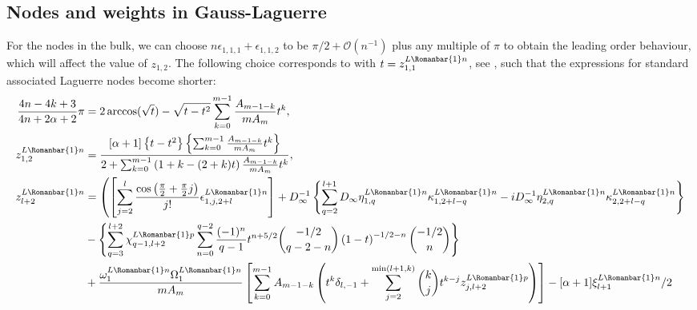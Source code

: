 \documentclass[11pt]{article}
\newcommand*{\Pc}[1]{{\color{blue}#1}}
\newcommand{\ql}{L}
\newcommand{\rb}{{\scriptsize \Romanbar{1}} }
\newcommand{\pg}{p}
\newcommand{\pn}{n}
\numberwithin{equation}{section}
\begin{document}
\subsection{Nodes and weights in Gauss-Laguerre} \label{SderxkwkGL}



For the nodes in the bulk, we %
can choose $n\epsilon_{1,1,1} +\epsilon_{1,1,2}$ to be $\pi/2 + \mathcal{O}(n^{-1})$ plus any multiple of $\pi$ to obtain the leading order behaviour, which will affect the value of $z_{1,2}$. The following choice corresponds to \cite[(57)]{tricBulk} with $t = z_{1,1}^{\ql\rb\pn}$, see \cite[\S 3.2 \& 4.3]{quadr}, such that the expressions for standard associated Laguerre nodes become shorter:
\begin{align}
	\frac{4 n -4 k+3}{4 n +2 \alpha +2}\pi & = 2 \arccos(\sqrt{t}) - \sqrt{t-t^2}\sum_{k=0}^{m-1}\frac{A_{m-1-k}}{mA_m} t^k, \label{EtranscMon} \\ %
	z_{1,2}^{\ql\rb\pn} & =  \frac{[\alpha +1]\left\{t - t^2\right\}\left\{\sum_{k=0}^{m-1}\frac{A_{m-1-k}}{mA_m} t^k \right\} }{2 + \sum_{k=0}^{m-1}\left(1 + k -(2+k)t \right)\frac{A_{m-1-k}}{mA_m} t^k }, \\ %
	z_{l+2}^{\ql\rb\pn} & = \left( \left[\sum_{j=2}^{l} \frac{\cos\left(\frac{\pi}{2} +\frac{\pi}{2}j\right) }{j!} \epsilon_{1, j, 2+l}^{\ql\rb\pn} \right] + D_\infty^{-1} \left\{\sum_{q=2}^{l+1} D_\infty \eta_{1,q}^{\ql\rb\pn}  \kappa_{1,2+l-q}^{\ql\rb\pn}  -i D_\infty^{-1} \eta_{2,q}^{\ql\rb\pn} \kappa_{2,2+l-q}^{\ql\rb\pn} \right\} \right. \label{EquaExpNodeBulk} \\ %
	&  - \left\{\sum_{q=3}^{l+2} \chi_{q-1,l+2}^{\ql\rb\pg} \sum_{n=0}^{q-2} \frac{(-1)^n}{q-1} t^{n+5/2} {-1/2 \choose q-2-n} \left(1 -t \right)^{-1/2-n} {-1/2 \choose n} \right\} \\ %
	&  + \frac{\omega_1^{\ql\rb\pn}\Omega_1^{\ql\rb\pn}}{mA_m}\left[ \sum_{k=0}^{m-1} A_{m-1-k}  \left( t^k \delta_{l,-1} + \sum_{j=2}^{\min(l+1,k)} {k \choose j} t^{k-j} z_{j,l+2}^{\ql\rb\pg} \right)  \right] -[\alpha+1]\xi_{l+1}^{\ql\rb\pn}/2 \\ %

\end{align}
\end{document}
